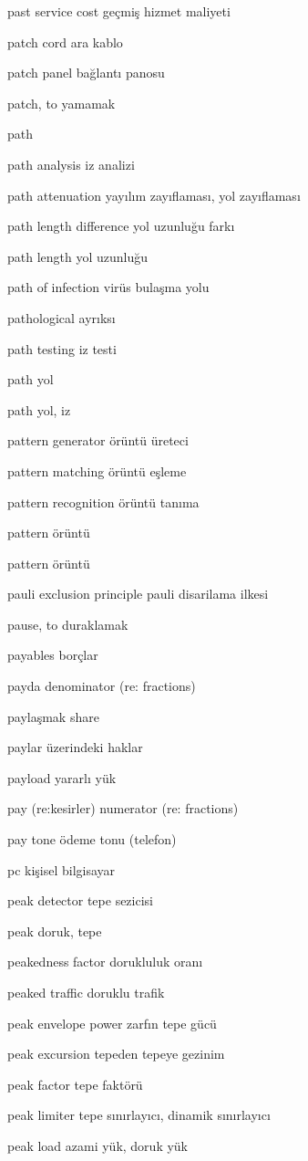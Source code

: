 \documentclass[12pt,fleqn]{article}\usepackage{../../common}
\begin{document}
past service cost geçmiş hizmet maliyeti

patch cord ara kablo

patch panel bağlantı panosu

patch, to yamamak

path

path analysis iz analizi

path attenuation yayılım zayıflaması, yol zayıflaması

path length difference yol uzunluğu farkı

path length yol uzunluğu

path of infection virüs bulaşma yolu

pathological ayrıksı

path testing iz testi

path yol

path yol, iz

pattern generator örüntü üreteci

pattern matching örüntü eşleme

pattern recognition örüntü tanıma

pattern örüntü

pattern örüntü

pauli exclusion principle pauli disarilama ilkesi

pause, to duraklamak

payables borçlar

payda denominator (re: fractions)

paylaşmak share

paylar üzerindeki haklar

payload yararlı yük

pay (re:kesirler) numerator (re: fractions)

pay tone ödeme tonu (telefon)

pc kişisel bilgisayar

peak detector tepe sezicisi

peak doruk, tepe

peakedness factor dorukluluk oranı

peaked traffic doruklu trafik

peak envelope power zarfın tepe gücü

peak excursion tepeden tepeye gezinim

peak factor tepe faktörü

peak limiter tepe sınırlayıcı, dinamik sınırlayıcı

peak load azami yük, doruk yük
\end{document}
